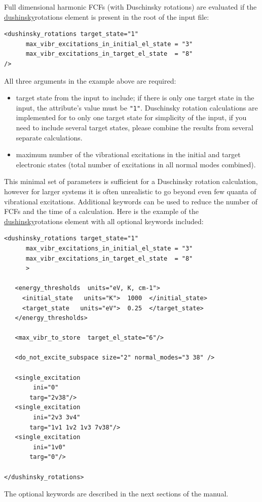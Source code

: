 \documentclass[11pt]{article}
\begin{document}
Full dimensional harmonic FCFs (with Duschinsky rotations) are evaluated
if the \ul{dushinsky}{rotations} element is present in the root of the input \xml file:
\begin{lstlisting}[frame=single,framerule=0pt]
<dushinsky_rotations target_state="1"
      max_vibr_excitations_in_initial_el_state = "3"
      max_vibr_excitations_in_target_el_state  = "8"
/>
\end{lstlisting}
All three arguments in the example above are required:
\begin{itemize}
\item target state from the input to include; 
if there is only one target state in the input, the attribute's value must be {\tt "1"}.
Duschinsky rotation calculations are implemented for to only one target state for simplicity of the input,
if you need to include several target states, please combine the results from several separate calculations.
\item maximum number of the vibrational excitations in the initial and target electronic states
(total number of excitations in all normal modes combined).
\end{itemize}
This minimal set of parameters is sufficient for a Duschinsky rotation calculation, 
however for larger systems it is often unrealistic to go beyond even few quanta of vibrational excitations. 
Additional keywords can be used to reduce the number of FCFs and the time of a calculation. 
Here is the example of the \ul{dushinsky}{rotations} element with all optional keywords included:
\begin{lstlisting}[frame=single,framerule=0pt]
<dushinsky_rotations target_state="1"
      max_vibr_excitations_in_initial_el_state = "3"
      max_vibr_excitations_in_target_el_state  = "8"
      > 

   <energy_thresholds  units="eV, K, cm-1">
     <initial_state   units="K">  1000  </initial_state>
     <target_state   units="eV">  0.25  </target_state>
   </energy_thresholds>
  
   <max_vibr_to_store  target_el_state="6"/>

   <do_not_excite_subspace size="2" normal_modes="3 38" />

   <single_excitation 
        ini="0" 
       targ="2v38"/>
   <single_excitation 
        ini="2v3 3v4"  
       targ="1v1 1v2 1v3 7v38"/>
   <single_excitation 
        ini="1v0" 
       targ="0"/>

</dushinsky_rotations>
\end{lstlisting}
The optional keywords are described in the next sections of the manual.
\end{document}
